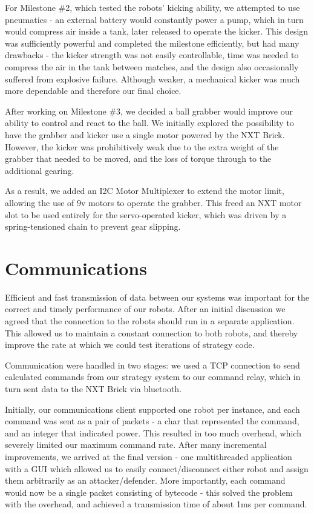 \documentclass[a4paper,11pt]{article}
\begin{document}
For Milestone \#2, which tested the robots' kicking ability, we attempted to use pneumatics - an external battery would constantly power a pump, which in turn would compress air inside a tank, later released to operate the kicker. This design was sufficiently powerful and completed the milestone efficiently, but had many drawbacks - the kicker strength was not easily controllable, time was needed to compress the air in the tank between matches, and the design also occasionally suffered from explosive failure. Although weaker, a mechanical kicker was much more dependable and therefore our final choice.

After working on Milestone \#3, we decided a ball grabber would improve our ability to control and react to the ball. We initially explored the possibility to have the grabber and kicker use a single motor powered by the NXT Brick. However, the kicker was prohibitively weak due to the extra weight of the grabber that needed to be moved, and the loss of torque through to the additional gearing.

As a result, we added an I2C Motor Multiplexer to extend the motor limit, allowing the use of 9v motors to operate the grabber. This freed an NXT motor slot to be used entirely for the servo-operated kicker, which was driven by a spring-tensioned chain to prevent gear slipping.




\section{Communications}

Efficient and fast transmission of data between our systems was important for the correct and timely performance of our robots. After an initial discussion we agreed that the connection to the robots should run in a separate application. This allowed us to maintain a constant connection to both robots, and thereby improve the rate at which we could test iterations of strategy code.

Communication were handled in two stages: we used a TCP connection to send calculated commands from our strategy system to our command relay, which in turn sent data to the NXT Brick via bluetooth.

Initially, our communications client supported one robot per instance, and each command was sent as a pair of packets - a char that represented the command, and an integer that indicated power. This resulted in too much overhead, which severely limited our maximum command rate. After many incremental improvements, we arrived at the final version - one multithreaded application with a GUI which allowed us to easily connect/disconnect either robot and assign them arbitrarily as an attacker/defender. More importantly, each command would now be a single packet consisting of bytecode - this solved the problem with the overhead, and achieved a transmission time of about 1ms per command.
\end{document}

